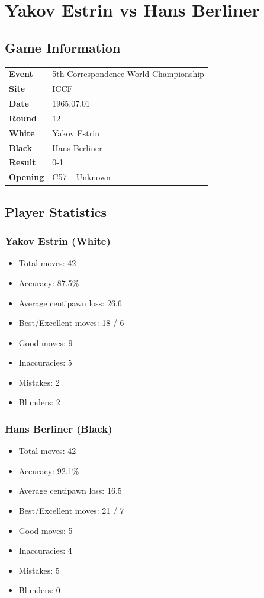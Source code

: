 \documentclass[11pt]{book}
\begin{document}
\chapter{Yakov Estrin vs Hans Berliner}

\section{Game Information}
\begin{tabular}{ll}
\textbf{Event} & 5th Correspondence World Championship \\
\textbf{Site} & ICCF \\
\textbf{Date} & 1965.07.01 \\
\textbf{Round} & 12 \\
\textbf{White} & Yakov Estrin \\
\textbf{Black} & Hans Berliner \\
\textbf{Result} & 0-1 \\
\textbf{Opening} & C57 -- Unknown \\
\end{tabular}

\section{Player Statistics}

\subsection{Yakov Estrin (White)}
\begin{itemize}
\item Total moves: 42
\item Accuracy: 87.5\%
\item Average centipawn loss: 26.6
\item Best/Excellent moves: 18 / 6
\item Good moves: 9
\item Inaccuracies: 5
\item Mistakes: 2
\item Blunders: 2
\end{itemize}

\subsection{Hans Berliner (Black)}
\begin{itemize}
\item Total moves: 42
\item Accuracy: 92.1\%
\item Average centipawn loss: 16.5
\item Best/Excellent moves: 21 / 7
\item Good moves: 5
\item Inaccuracies: 4
\item Mistakes: 5
\item Blunders: 0
\end{itemize}
\end{document}
